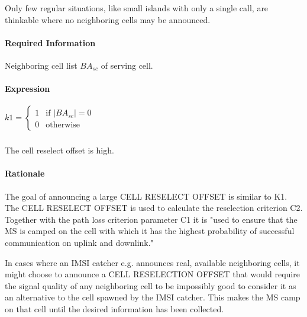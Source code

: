 \documentclass[a4paper,11pt,notitlepage,bigheadings,oneside]{scrartcl}
\begin{document}
Only few regular situations, like small islands with only a single call, are
thinkable where no neighboring cells may be announced.


\paragraph{Required Information}

Neighboring cell list $BA_{sc}$ of serving cell.

\paragraph{Expression}

$k1 =
\begin{cases}
	1 & \text{if } \left|BA_{sc}\right| = 0 \\
	0 & \text{otherwise}
\end{cases}$


\subsubsection{}

The cell reselect offset is high.

\paragraph{Rationale}

The goal of announcing a large CELL RESELECT OFFSET is similar to K1. The CELL
RESELECT OFFSET is used to calculate the reselection criterion C2. Together
with the path loss criterion parameter C1 it is "used to ensure that the MS is
camped on the cell with which it has the highest probability of successful
communication on uplink and downlink." \cite[6.4]{gsm0508}

In cases where an IMSI catcher e.g. announces real, available neighboring
cells, it might choose to announce a CELL RESELECTION OFFSET that would require
the signal quality of any neighboring cell to be impossibly good to consider it
as an alternative to the cell spawned by the IMSI catcher. This makes the MS
camp on that cell until the desired information has been collected.
\end{document}
